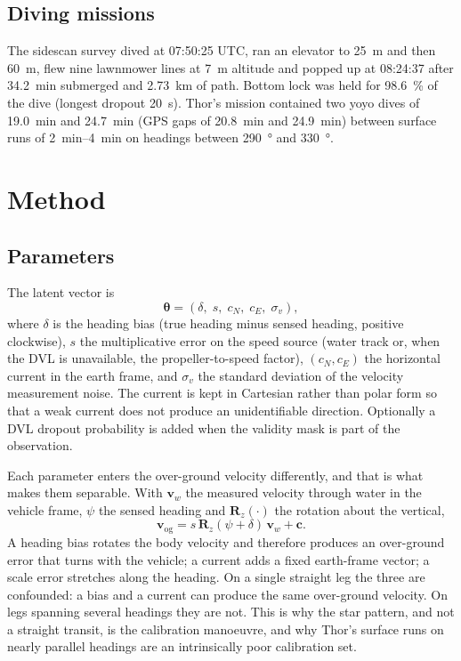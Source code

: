 \documentclass[conference]{IEEEtran}
\newcommand{\vect}[1]{\boldsymbol{#1}}
\newcommand{\btheta}{\vect{\theta}}
\newcommand{\Rz}{\mathbf{R}_z}
\begin{document}
\subsection{Diving missions}

The sidescan survey dived at 07:50:25 UTC, ran an elevator to \SI{25}{\meter} and then \SI{60}{\meter}, flew nine lawnmower lines at \SI{7}{\meter} altitude and popped up at 08:24:37 after \SI{34.2}{\minute} submerged and \SI{2.73}{\kilo\meter} of path. Bottom lock was held for \SI{98.6}{\percent} of the dive (longest dropout \SI{20}{\second}). Thor's mission contained two yoyo dives of \SI{19.0}{\minute} and \SI{24.7}{\minute} (GPS gaps of \SI{20.8}{\minute} and \SI{24.9}{\minute}) between surface runs of \SIrange{2}{4}{\minute} on headings between \SI{290}{\degree} and \SI{330}{\degree}.

\section{Method}

\subsection{Parameters}

The latent vector is
\begin{equation}
\btheta = (\delta,\; s,\; c_N,\; c_E,\; \sigma_v),
\end{equation}
where $\delta$ is the heading bias (true heading minus sensed heading, positive clockwise), $s$ the multiplicative error on the speed source (water track or, when the DVL is unavailable, the propeller-to-speed factor), $(c_N, c_E)$ the horizontal current in the earth frame, and $\sigma_v$ the standard deviation of the velocity measurement noise. The current is kept in Cartesian rather than polar form so that a weak current does not produce an unidentifiable direction. Optionally a DVL dropout probability is added when the validity mask is part of the observation.

Each parameter enters the over-ground velocity differently, and that is what makes them separable. With $\vect{v}_w$ the measured velocity through water in the vehicle frame, $\psi$ the sensed heading and $\Rz(\cdot)$ the rotation about the vertical,
\begin{equation}
\vect{v}_{\mathrm{og}} = s\,\Rz(\psi + \delta)\,\vect{v}_w + \vect{c}.
\label{eq:model}
\end{equation}
A heading bias rotates the body velocity and therefore produces an over-ground error that turns with the vehicle; a current adds a fixed earth-frame vector; a scale error stretches along the heading. On a single straight leg the three are confounded: a bias and a current can produce the same over-ground velocity. On legs spanning several headings they are not. This is why the star pattern, and not a straight transit, is the calibration manoeuvre, and why Thor's surface runs on nearly parallel headings are an intrinsically poor calibration set.
\end{document}
